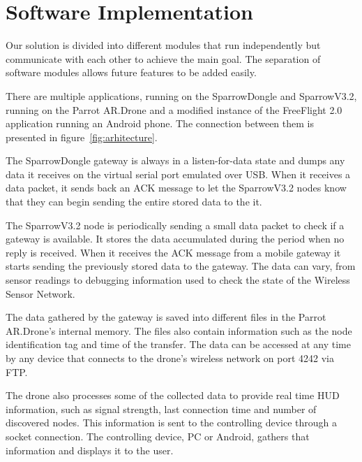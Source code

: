 
\normalfont\normalsize
\chapter{Software Implementation}

Our solution is divided into different modules that run independently but communicate with each other to achieve the main goal. The separation of software modules allows future features to be added easily.

There are multiple applications, running on the SparrowDongle and SparrowV3.2, running on the Parrot AR.Drone and a modified instance of the FreeFlight 2.0 application running an Android phone. The connection between them is presented in figure~\ref{fig:arhitecture}.

The SparrowDongle gateway is always in a listen-for-data state and dumps any data it receives on the virtual serial port emulated over USB. When it receives a data packet, it sends back an ACK message to let the SparrowV3.2 nodes know that they can begin sending the entire stored data to the it.

The SparrowV3.2 node is periodically sending a small data packet to check if a gateway is available. It stores the data accumulated during the period when no reply is received. When it receives the ACK message from a mobile gateway it starts sending the previously stored data to the gateway. The data can vary, from sensor readings to debugging information used to check the state of the Wireless Sensor Network.

The data gathered by the gateway is saved into different files in the Parrot AR.Drone's internal memory. The files also contain information such as the node identification tag and time of the transfer. The data can be accessed at any time by any device that connects to the drone's wireless network on port 4242 via FTP.

The drone also processes some of the collected data to provide real time HUD information, such as signal strength, last connection time and number of discovered nodes. This information is sent to the controlling device through a socket connection. The controlling device, PC or Android, gathers that information and displays it to the user.

\clearpage

